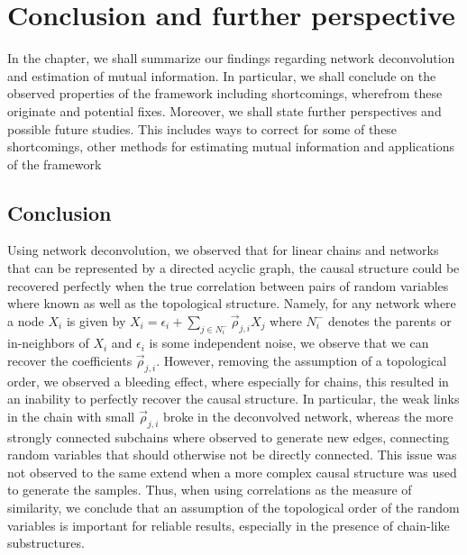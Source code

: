\documentclass[../Thesis.tex]{subfiles}
\begin{document}
\chapter{Conclusion and further perspective}\label{chap:conclusion}
In the chapter, we shall summarize our findings regarding network deconvolution and estimation of mutual information. In particular, we shall conclude on the observed properties of the framework including shortcomings, wherefrom these originate and potential fixes. Moreover, we shall state further perspectives and possible future studies. This includes ways to correct for some of these shortcomings, other methods for estimating mutual information and applications of the framework

\section{Conclusion}
Using network deconvolution, we observed that for linear chains and networks that can be represented by a directed acyclic graph, the causal structure could be recovered perfectly when the true correlation between pairs of random variables where known as well as the topological structure. Namely, for any network where a node $X_i$ is given by $X_i = \epsilon_i + \sum_{j\in N_i^-} \vec{\rho}_{j,i}X_j$ where $N_i^-$ denotes the parents or in-neighbors of $X_i$ and $\epsilon_i$ is some independent noise, we observe that we can recover the coefficients $\vec{\rho}_{j,i}$. However, removing the assumption of a topological order, we observed a bleeding effect, where especially for chains, this resulted in an inability to perfectly recover the causal structure. In particular, the weak links in the chain with small $\vec{\rho}_{j,i}$ broke in the deconvolved network, whereas the more strongly connected subchains where observed to generate new edges, connecting random variables that should otherwise not be directly connected. This issue was not observed to the same extend when a more complex causal structure was used to generate the samples. Thus, when using correlations as the measure of similarity, we conclude that an assumption of the topological order of the random variables is important for reliable results, especially in the presence of chain-like substructures.
\end{document}
